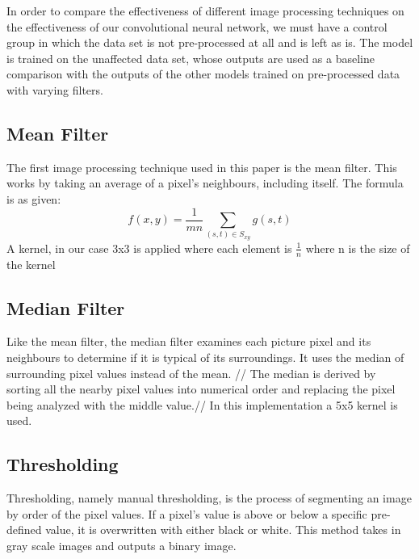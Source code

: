 \documentclass[conference]{IEEEtran}
\begin{document}
In order to compare the effectiveness of different image processing techniques on the effectiveness of our convolutional neural network, we must have a control group in which the data set is not pre-processed at all and is left as is. The model is trained on the unaffected data set, whose outputs are used as a baseline comparison with the outputs of the other models trained on pre-processed data with varying filters.
\subsection{Mean Filter}
The first image processing technique used in this paper is the mean filter. This works by taking an average of a pixel's neighbours, including itself. The formula is as given: \cite{b2}
\[f(x,y) = \frac{1}{mn}\sum_{(s,t)\in S_{xy}} g(s,t)\]
A kernel, in our case 3x3 is applied where each element is $\frac{1}{n}$ where n is the size of the kernel

\subsection{Median Filter}
Like the mean filter, the median filter examines each picture pixel and its neighbours to determine if it is typical of its surroundings. It uses the median of surrounding pixel values instead of the mean. 
//
The median is derived by sorting all the nearby pixel values into numerical order and replacing the pixel being analyzed with the middle value.//
In this implementation a 5x5 kernel is used.

\subsection{Thresholding}
Thresholding, namely manual thresholding, is the process of segmenting an image by order of the pixel values. If a pixel's value is above or below a specific pre-defined value, it is overwritten with either black or white. This method takes in gray scale images and outputs a binary image.
\end{document}
